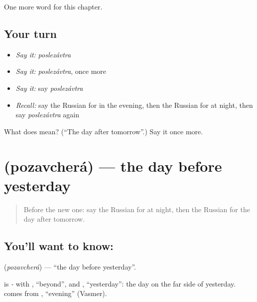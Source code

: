 \begin{grammarlens}[title={What you've built}]
One more word for this chapter.
\end{grammarlens}

\subsection*{Your turn}
\begin{itemize}
\raggedright
  \item \emph{Say it:} \emph{poslezávtra}
  \item \emph{Say it:} \emph{poslezávtra}, once more
  \item \emph{Say it:} say \emph{poslezávtra}
  \item \emph{Recall:} say the Russian for in the evening, then the Russian for at night, then say \emph{poslezávtra} again
\end{itemize}

\begin{tcolorbox}[breakable,colback=teal!4,colframe=teal!35!black,title={Before you move on}]
What does  mean? (\textquotedblleft{}The day after tomorrow\textquotedblright{}.) Say it once more.
\end{tcolorbox}
\section[\texorpdfstring{\ru{позавчера} (pozavcherá)}{позавчера (pozavcherá)}]{ (pozavcherá) — the day before yesterday}

\label{lesson:RU-C84-day-before-yesterday}



\begin{quote}
Before the new one: say the Russian for at night, then the Russian for the day after tomorrow.
\end{quote}

\subsection*{You'll want to know: }
\textbf{} (\emph{pozavcherá}) — \textquotedblleft{}the day before yesterday\textquotedblright{}.

\begin{cousinweb}
\textbf{} is \emph{-} with \emph{}, \textquotedblleft{}beyond\textquotedblright{}, and \emph{}, \textquotedblleft{}yesterday\textquotedblright{}: the day on the far side of yesterday. \emph{} comes from \emph{}, \textquotedblleft{}evening\textquotedblright{} (Vasmer).
\end{cousinweb}

